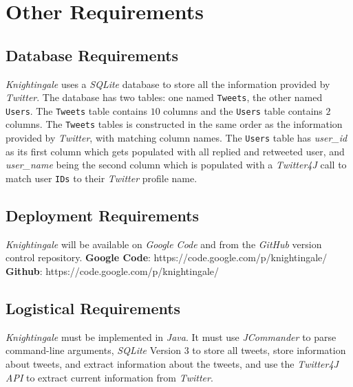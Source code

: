 \documentclass[a4paper, 12pt]{article}
\begin{document}
\section{Other Requirements} \label{sec:other}
\subsection{Database Requirements} \label{sec:database}
\begin{adjustwidth}{2em}{0pt}
\textit{Knightingale} uses a \textit{SQLite} database to store all the information provided by \textit{Twitter}. The database has two tables: one named \texttt{Tweets}, the other named \texttt{Users}. The \texttt{Tweets} table contains $10$ columns and the \texttt{Users} table contains $2$ columns. The \texttt{Tweets} tables is constructed in the same order as the information provided by \textit{Twitter}, with matching column names. The \texttt{Users} table has \textit{user\_id} as its first column which gets populated with all replied and retweeted user, and \textit{user\_name} being the second column which is populated with a \textit{Twitter4J} call to match user \texttt{IDs} to their \textit{Twitter} profile name.
\end{adjustwidth}

\subsection{Deployment Requirements} \label{sec:deployment}
\begin{adjustwidth}{2em}{0pt}
\textit{Knightingale} will be available on \textit{Google Code} and from the \textit{GitHub} version control repository. \newline
\noindent \textbf{Google Code}: https://code.google.com/p/knightingale/ \newline
\noindent \textbf{Github}: https://code.google.com/p/knightingale/
\end{adjustwidth}

\subsection{Logistical Requirements} \label{sec:logistic}
\begin{adjustwidth}{2em}{0pt}
\textit{Knightingale} must be implemented in \textit{Java}. It must use \textit{JCommander} to parse command-line arguments, \textit{SQLite} Version $3$ to store all tweets, store information about tweets, and extract information about the tweets, and use the \textit{Twitter4J API} to extract current information from \textit{Twitter}.
\end{adjustwidth} 
\end{document}
